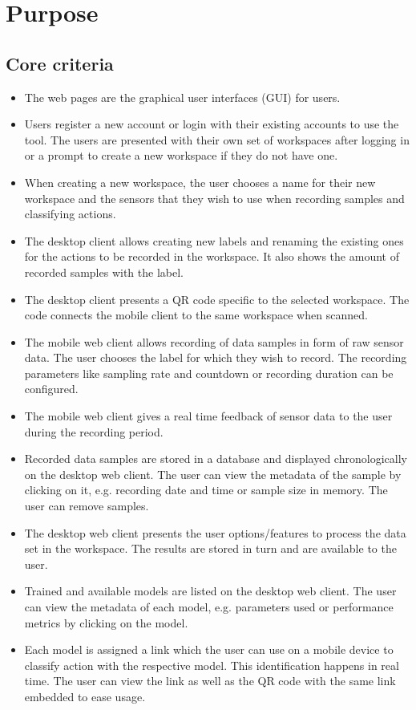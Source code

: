 \section{Purpose}

\subsection{Core criteria}
\begin{itemize}
    \item The web pages are the graphical user interfaces (GUI) for users.
    \item Users register a new account or login with their existing accounts to use the tool. The users are presented with their own set of workspaces after logging in or a prompt to create a new workspace if they do not have one.
    \item When creating a new workspace, the user chooses a name for their new workspace and the sensors that they wish to use when recording samples and classifying actions. %
    \item The desktop client allows creating new labels and renaming the existing ones for the actions to be recorded in the workspace. It also shows the amount of recorded samples with the label. 
    \item The desktop client presents a QR code specific to the selected workspace. The code connects the mobile client to the same \gls{workspace} when scanned.
    \item The mobile web client allows recording of data samples in form of raw sensor data. The user chooses the label for which they wish to record. The recording parameters like sampling rate and countdown or recording duration can be configured.
    \item The mobile web client gives a real time feedback of sensor data to the user during the recording period.
    \item Recorded data samples are stored in a database and displayed chronologically on the desktop web client. The user can view the metadata of the sample by clicking on it, e.g. recording date and time or sample size in memory. The user can remove samples.
    \item The desktop web client presents the user options/features to process the data set in the workspace. The results are stored in turn and are available to the user. %
    \item Trained and available models are listed on the desktop web client. The user can view the metadata of each model, e.g. parameters used or performance metrics by clicking on the model.
    \item Each model is assigned a link which the user can use on a mobile device to classify action with the respective model. This identification happens in real time. The user can view the link as well as the QR code with the same link embedded to ease usage.
\end{itemize}

